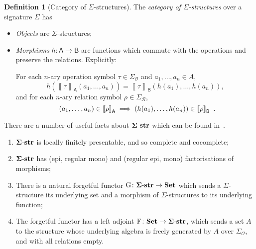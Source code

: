 \documentclass[11pt, a4paper, twoside,leqno]{amsart}
\newcommand{\cat}[1]{\mathbf{#1}}
\newcommand{\dbr}[1]{\left\llbracket{#1}\right\rrbracket}
\renewcommand{\O}{{\mathcal O}}
\newcommand{\R}{{\mathcal R}}
\numberwithin{equation}{section}
\theoremstyle{plain}
\theoremstyle{definition}
\newtheorem{Defn}[Thm]{Definition}
\newcommand{\Set}{\cat{Set}}
\newcommand{\Sig}{\mathbf \Sigma\text-\cat{str}}
\begin{document}
\begin{Defn}[Category of \(\Sigma\)-structures]
  \label{def:cat-sig-st}
  The \emph{category of \(\Sigma\)-structures} over a signature
  \(\Sigma\) has
  \begin{itemize}
  \item \emph{Objects} are \(\Sigma\)-structures;
  \item \emph{Morphisms} \(h \colon \mathsf{A} \rightarrow \mathsf{B}\) are
    functions which commute with the operations and preserve the
    relations. Explicitly:
    
    For each \(n\)-ary operation symbol \(\tau
    \in \Sigma_{\O }\) and \(a_{1},\dots, a_{n}\in A\), 
    \begin{equation*}
      h(\dbr{\tau}_{\mathsf{A}}(a_{1},\dotsc,a_{n})) = \dbr{\tau}_{\mathsf{B}} (h(a_{1}),\dotsc , h(a_{n})),
    \end{equation*}
    and for each \(n\)-ary relation symbol \(\rho \in \Sigma_{\R}\),
    \begin{equation*}
      (a_{1},\dotsc, a_{n}) \in \dbr{\rho}_{\mathsf{A}} \implies \left(h (a_{1}), \dotsc ,h(a_{n})\right) \in \dbr{\rho}_{\mathsf{B}} \rlap{ .}
    \end{equation*}
  \end{itemize}
\end{Defn}


There are a number of useful facts about \(\Sig\) which can be found
in~\cite{Adamek:1994aa}. 
\begin{enumerate}[label=(\alph*), ref=(\alph*)]
\item
  \label{it:sig-lfp}
  \(\Sig\) is locally finitely presentable, and so complete and
  cocomplete;
\item
  \label{it:sig-factor-sys}
  \(\Sig\) has (epi, regular mono) and (regular epi, mono)
  factorisations of morphisms;
\item
  \label{it:sig-forgetful}
  There is a natural forgetful functor
  \(\mathrm{G}
  \colon \Sig \rightarrow \Set\) which sends a \(\Sigma\)-structure
  its underlying set and a morphism of \(\Sigma\)-structures to its
  underlying function;
\item
  \label{it:sig-free}
  The forgetful functor has a
  left adjoint \(\mathrm{F}
  \colon \Set \rightarrow \Sig\), which sends a set \(A\) to the
  structure whose underlying algebra is freely generated by \(A\) over
  \(\Sigma_{\O}\), and with all relations empty.

\end{enumerate}
\end{document}
